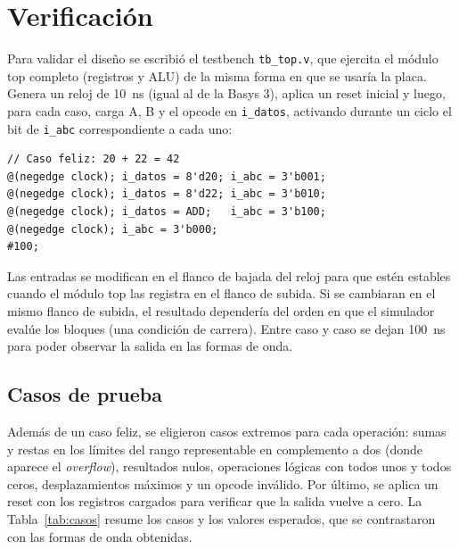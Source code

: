 \section{Verificación}
Para validar el diseño se escribió el testbench \texttt{tb\_top.v}, que ejercita el módulo top completo (registros y ALU) de la misma forma en que se usaría la placa. Genera un reloj de 10~ns (igual al de la Basys 3), aplica un reset inicial y luego, para cada caso, carga A, B y el opcode en \texttt{i\_datos}, activando durante un ciclo el bit de \texttt{i\_abc} correspondiente a cada uno:

\begin{lstlisting}[caption={Carga de un caso en el testbench.}]
// Caso feliz: 20 + 22 = 42
@(negedge clock); i_datos = 8'd20; i_abc = 3'b001;
@(negedge clock); i_datos = 8'd22; i_abc = 3'b010;
@(negedge clock); i_datos = ADD;   i_abc = 3'b100;
@(negedge clock); i_abc = 3'b000;
#100;
\end{lstlisting}

Las entradas se modifican en el flanco de bajada del reloj para que estén estables cuando el módulo top las registra en el flanco de subida. Si se cambiaran en el mismo flanco de subida, el resultado dependería del orden en que el simulador evalúe los bloques (una condición de carrera). Entre caso y caso se dejan 100~ns para poder observar la salida en las formas de onda.

\subsection{Casos de prueba}
Además de un caso feliz, se eligieron casos extremos para cada operación: sumas y restas en los límites del rango representable en complemento a dos (donde aparece el \textit{overflow}), resultados nulos, operaciones lógicas con todos unos y todos ceros, desplazamientos máximos y un opcode inválido. Por último, se aplica un reset con los registros cargados para verificar que la salida vuelve a cero. La Tabla~\ref{tab:casos} resume los casos y los valores esperados, que se contrastaron con las formas de onda obtenidas.

